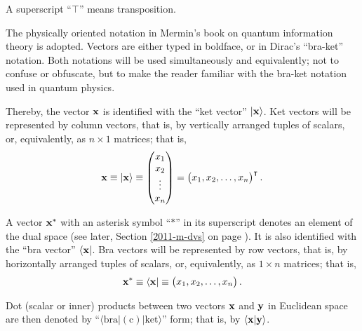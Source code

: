 A superscript ``$\intercal$'' means transposition.

The physically oriented notation in Mermin's book on
quantum information theory\cite[-7mm]{mermin-04} is adopted.
Vectors are either typed in boldface, or in Dirac's ``bra-ket'' notation.\cite{dirac}
Both notations will be used simultaneously and equivalently;
not to confuse or obfuscate, but to make  the reader familiar with the bra-ket
notation used in quantum physics.

Thereby,
the vector ${\bf x}$ is identified with the ``ket vector'' $\vert {\bf x}\rangle$.
Ket vectors will be represented by column vectors, that is, by vertically arranged tuples of scalars,
or, equivalently, as $n \times 1$ matrices; that is,
\begin{equation}
{\bf x}
\equiv
\vert {\bf x}\rangle
\equiv
\begin{pmatrix}
x_1\\
x_2\\
\vdots \\
x_n
\end{pmatrix}
=\begin{pmatrix}
x_1,
x_2,
\ldots ,
x_n
\end{pmatrix}^\intercal
.
\end{equation}


A vector ${\bf x}^\ast$ with an asterisk symbol ``$\ast$'' in its superscript denotes an element of the dual space (see later, Section \ref{2011-m-dvs} on page \pageref{2011-m-dvs}).
It is also identified with the ``bra vector'' $\langle {\bf x}\vert$.
Bra vectors will be represented by row vectors, that is, by horizontally arranged tuples of scalars,
or, equivalently, as $1 \times n$ matrices; that is,
\begin{equation}
{\bf x}^\ast
\equiv
\langle {\bf x}   \vert
\equiv
\begin{pmatrix}
x_1,
x_2,
\ldots ,
x_n
\end{pmatrix}
.
\end{equation}



Dot (scalar or inner) products between two vectors ${\bf x}$ and ${\bf y}$   in Euclidean space are then
denoted by ``$\langle \textrm{bra} \vert  (\textrm{c}) \vert \textrm{ket}  \rangle$''  form;
that is, by $\langle {\bf x} \vert  {\bf y}  \rangle$.




